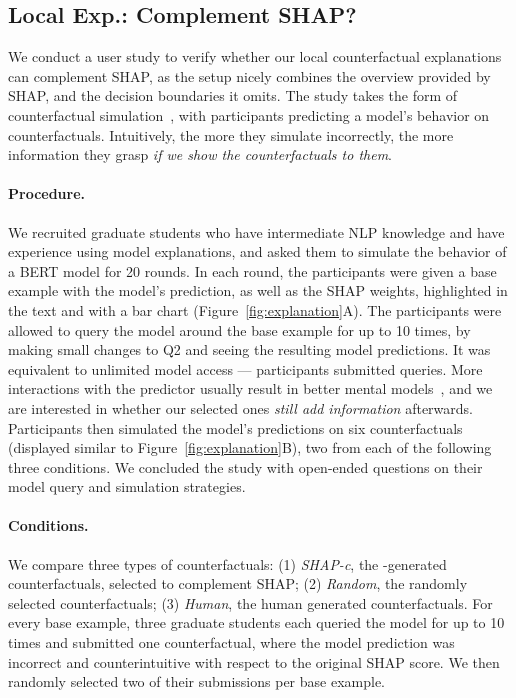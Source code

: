 \subsection{Local Exp.: Complement SHAP?}
\label{subsec:exp_user_study}

We conduct a user study to verify whether our local counterfactual explanations can complement SHAP, as the setup nicely combines the overview provided by SHAP, and the decision boundaries it omits.
The study takes the form of counterfactual simulation~\cite{hase2020evaluating}, with participants predicting a model's behavior on counterfactuals.
Intuitively, the more they simulate incorrectly, the more information they grasp \emph{if we show the counterfactuals to them}.

\paragraph{Procedure.}
We recruited  graduate students who have intermediate NLP knowledge and have experience using model explanations, and asked them to simulate the behavior of a \qqp BERT model for 20 rounds.
In each round, the participants were given a base example with the model's prediction, as well as the SHAP weights, highlighted in the text and with a bar chart (Figure~\ref{fig:explanation}A).
The participants were allowed to query the model around the base example for up to 10 times, by making small changes to Q2 and seeing the resulting model predictions.
It was equivalent to unlimited model access --- participants submitted  queries.
More interactions with the predictor usually result in better mental models~\cite{miller}, and we are interested in whether our selected ones \emph{still add information} afterwards.
Participants then simulated the model's predictions on six counterfactuals (displayed similar to Figure~\ref{fig:explanation}B), two from each of the following three conditions.
We concluded the study with open-ended questions on their model query and simulation strategies.



\newcommand{\cshap}{\emph{SHAP-c}\xspace}
\newcommand{\crandom}{\emph{Random}\xspace}
\newcommand{\chuman}{\emph{Human}\xspace}
\paragraph{Conditions.} 
We compare three types of counterfactuals:
(1) \cshap, the \sysname-generated counterfactuals, selected to complement SHAP; 
(2) \crandom, the randomly selected \sysname counterfactuals; 
(3) \chuman, the human generated counterfactuals.
For every base example, three graduate students each queried the model for up to 10 times and submitted one counterfactual, where the model prediction was incorrect and counterintuitive with respect to the original SHAP score.
We then randomly selected two of their submissions per base example.





